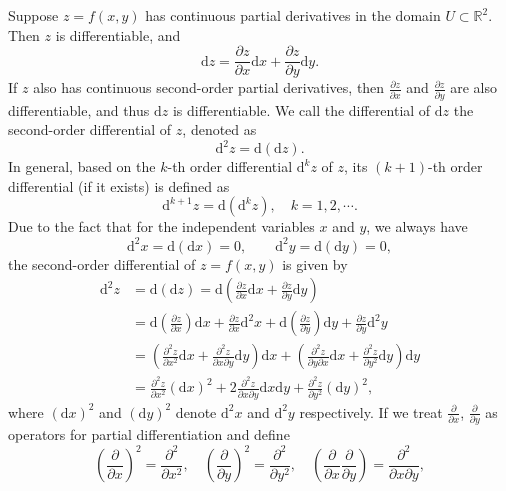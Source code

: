 \documentclass[11pt]{../../TexTemplate/elegantbook}
\begin{document}
Suppose \(z=f(x,y)\) has continuous partial derivatives in the domain \(U\subset \mathbb{R}^2\). 
Then \(z\) is differentiable, and
\[
    \mathrm{d}z = \frac{\partial z}{\partial x} \mathrm{d}x + \frac{\partial z}{\partial y} \mathrm{d}y.
\]
If \(z\) also has continuous second-order partial derivatives, 
then \(\frac{\partial z}{\partial x}\) and \(\frac{\partial z}{\partial y}\) are also differentiable, 
and thus \(\mathrm{d}z\) is differentiable. 
We call the differential of \(\mathrm{d}z\) the second-order differential of \(z\), denoted as
\[
    \mathrm{d}^2z = \mathrm{d}(\mathrm{d}z).
\]
In general, based on the \(k\)-th order differential \(\mathrm{d}^kz\) of \(z\), 
its \((k+1)\)-th order differential (if it exists) is defined as
\[
    \mathrm{d}^{k+1}z = \mathrm{d}(\mathrm{d}^kz), \quad k = 1, 2, \cdots .
\]
Due to the fact that for the independent variables \( x \) and \( y \), we always have
\[
    \mathrm{d}^2 x = \mathrm{d}(\mathrm{d}x) = 0, \qquad \mathrm{d}^2 y = \mathrm{d}(\mathrm{d}y) = 0,
\]
the second-order differential of \( z = f(x, y) \) is given by
\begin{align*}
    \mathrm{d}^2 z &= \mathrm{d}(\mathrm{d}z) 
        = \mathrm{d}\left( \frac{\partial z}{\partial x} \mathrm{d}x + \frac{\partial z}{\partial y} \mathrm{d}y \right) \\
    &= \mathrm{d}\left( \frac{\partial z}{\partial x} \right) \mathrm{d}x + \frac{\partial z}{\partial x} \mathrm{d}^2 x 
        + \mathrm{d}\left( \frac{\partial z}{\partial y} \right) \mathrm{d}y + \frac{\partial z}{\partial y} \mathrm{d}^2 y\\
    &= \left( \frac{\partial^2 z}{\partial x^2} \mathrm{d}x + \frac{\partial^2 z}{\partial x \partial y} \mathrm{d}y \right) \mathrm{d}x
        + \left( \frac{\partial^2 z}{\partial y \partial x} \mathrm{d}x + \frac{\partial^2 z}{\partial y^2} \mathrm{d}y \right) \mathrm{d}y\\
    &= \frac{\partial^2 z}{\partial x^2} (\mathrm{d}x)^2 + 2 \frac{\partial^2 z}{\partial x \partial y} \mathrm{d}x \mathrm{d}y + \frac{\partial^2 z}{\partial y^2} (\mathrm{d}y)^2,
\end{align*}
where \( (\mathrm{d}x)^2 \) and \( (\mathrm{d}y)^2 \) denote \( \mathrm{d}^2 x \) and \( \mathrm{d}^2 y \) respectively.
If we treat \( \frac{\partial}{\partial x} \), \( \frac{\partial}{\partial y} \) as operators for partial differentiation 
and define
\[
    \left( \frac{\partial}{\partial x} \right)^2 = \frac{\partial^2}{\partial x^2}, \quad
    \left( \frac{\partial}{\partial y} \right)^2 = \frac{\partial^2}{\partial y^2}, \quad
    \left( \frac{\partial}{\partial x} \frac{\partial}{\partial y} \right) = \frac{\partial^2}{\partial x \partial y},
\]
\end{document}
